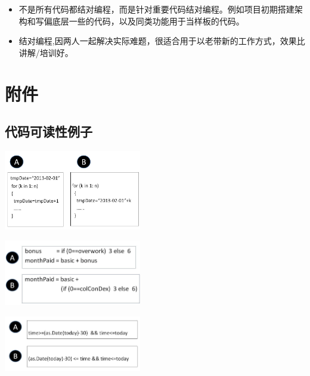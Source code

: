 \begin{itemize}
\tightlist
\item
  不是所有代码都结对编程，而是针对重要代码结对编程。例如项目初期搭建架构和写偏底层一些的代码，以及同类功能用于当样板的代码。
\item
  结对编程,因两人一起解决实际难题，很适合用于以老带新的工作方式，效果比讲解/培训好。
\end{itemize}

\hypertarget{ux9644ux4ef6}{%
\section{附件}\label{ux9644ux4ef6}}

\hypertarget{ux4ee3ux7801ux53efux8bfbux6027ux4f8bux5b50}{%
\subsection{代码可读性例子}\label{ux4ee3ux7801ux53efux8bfbux6027ux4f8bux5b50}}




\includegraphics[width=6cm]{leip17.jpg}

\includegraphics[width=6cm]{leip18.jpg}

\includegraphics[width=6cm]{leip19.jpg}




